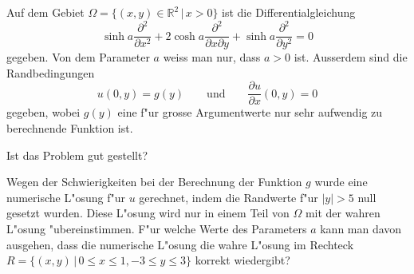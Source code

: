 Auf dem Gebiet $\Omega=\{(x,y)\in\mathbb R^2\,|\, x>0\}$ ist die
Differentialgleichung
\begin{equation}
\sinh a \frac{\partial^2}{\partial x^2}
+
2\cosh a \frac{\partial^2}{\partial x\partial y}
+
\sinh a \frac{\partial^2}{\partial y^2}
=
0
\label{90000013:dgl}
\end{equation}
gegeben.
Von dem Parameter $a$ weiss man nur, dass $a>0$ ist.
Ausserdem sind die Randbedingungen
\[
u(0,y)=g(y)\qquad\text{und}\qquad \frac{\partial u}{\partial x}(0,y)=0
\]
gegeben, wobei $g(y)$ eine f"ur grosse Argumentwerte nur sehr aufwendig zu
berechnende Funktion ist.
\begin{teilaufgaben}
\item
Ist das Problem gut gestellt?
\item
Wegen der Schwierigkeiten bei der Berechnung der Funktion $g$
wurde eine numerische L"osung f"ur $u$ gerechnet, indem die
Randwerte f"ur $|y|>5$ null gesetzt wurden.
Diese L"osung wird nur in einem Teil von $\Omega$ mit der wahren L"osung
"ubereinstimmen.
F"ur welche Werte des Parameters $a$ kann man davon ausgehen, dass die
numerische L"osung die wahre L"osung im Rechteck
$R=\{(x,y)\,|\, 0\le x\le 1,-3\le y\le 3\}$ korrekt
wiedergibt?
\end{teilaufgaben}


